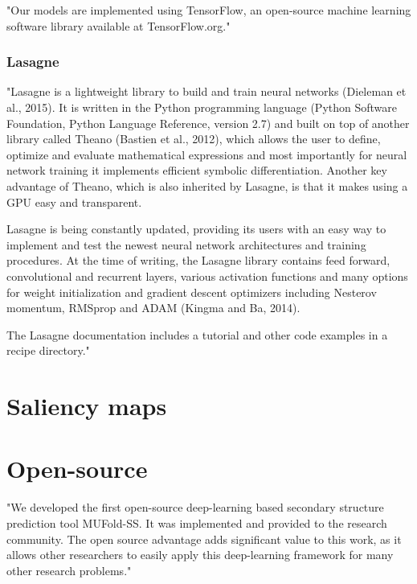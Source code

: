 "Our models are implemented using TensorFlow, an open-source machine learning software library available at TensorFlow.org." \cite{Busia2017}
\subsubsection{Lasagne}
"Lasagne is a lightweight library to build and train neural networks (Dieleman et al., 2015). It is written in the Python programming language (Python Software Foundation, Python Language Reference, version 2.7) and built on top of another library called Theano (Bastien et al., 2012), which allows the user to define, optimize and evaluate mathematical expressions and most importantly for neural network training it implements efficient symbolic differentiation. Another key advantage of Theano, which is also inherited by Lasagne, is that it makes using a GPU easy and transparent.

Lasagne is being constantly updated, providing its users with an easy way to implement and test the newest neural network architectures and training procedures. At the time of writing, the Lasagne library contains feed forward, convolutional and recurrent layers, various activation functions and many options for weight initialization and gradient descent optimizers including Nesterov momentum, RMSprop and ADAM (Kingma and Ba, 2014). 

The Lasagne documentation includes a tutorial and other code examples in a recipe directory." \cite{Jurtz2017}


\section{Saliency maps}


\section{Open-source}
"We developed the first open-source deep-learning based secondary structure prediction tool MUFold-SS. It was implemented and provided to the research community. The open source advantage adds significant value to this work, as it allows other researchers to easily apply this deep-learning framework for many other research problems." \cite{Fang2017}